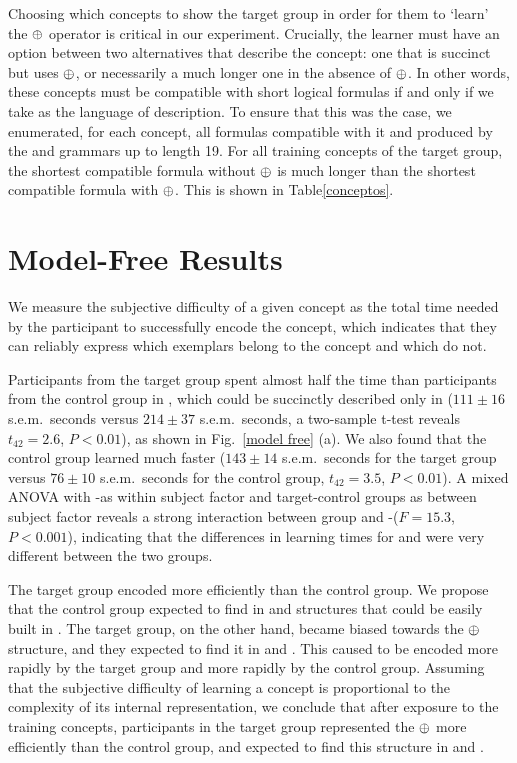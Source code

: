 Choosing which concepts to show the target group in order for them to `learn' the $\oplus$ operator is critical in our experiment. Crucially, the learner must have an option between two alternatives that describe the concept: one that is succinct but uses $\oplus$, or necessarily a much longer one in the absence of $\oplus$. In other words, these concepts must be compatible with short logical formulas if and only if we take \gramboolxor as the language of description. To ensure that this was the case, we enumerated, for each concept, all formulas compatible with it and produced by the \grambool and \gramboolxor grammars up to length 19. For all training concepts of the target group, the shortest compatible formula without $\oplus$ is much longer than the shortest compatible formula with $\oplus$. This is shown in Table\ref{conceptos}.

\section{Model-Free Results}

We measure the subjective difficulty of a given concept as the total time needed by the participant to successfully encode the concept, which indicates that they can reliably express which exemplars belong to the concept and which do not.

Participants from the target group spent almost half the time than participants from the control group in \testa, which could be succinctly described only in \gramboolxor ($111\pm16$ s.e.m.\ seconds versus $214\pm37$ s.e.m.\ seconds, a two-sample t-test reveals $t_{42}=2.6$, $P<0.01$), as shown in Fig.~\ref{model free} (a). We also found that the control group learned much faster \testb ($143\pm14$ s.e.m.\ seconds for the target group versus $76\pm10$ s.e.m.\ seconds for the control group, $t_{42}=3.5$, $P<0.01$). A mixed ANOVA with \testa-\testb as within subject factor and target-control groups as between subject factor reveals a strong interaction between group and \testa-\testb ($F=15.3$, $P<0.001$), indicating that the differences in learning times for \testa and \testb were very different between the two groups.

The target group encoded \testa more efficiently than the control group. We propose that the control group expected to find in \testa and \testb structures that could be easily built in \grambool. The target group, on the other hand, became biased towards the $\oplus$ structure, and they expected to find it in \testa and \testb. This caused \testa to be encoded more rapidly by the target group and \testb more rapidly by the control group. Assuming that the subjective difficulty of learning a concept is proportional to the complexity of its internal representation, we conclude that after exposure to the training concepts, participants in the target group represented the $\oplus$ more efficiently than the control group, and expected to find this structure in \testa and \testb.



